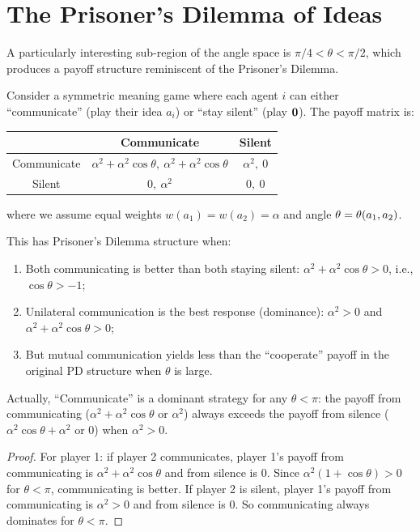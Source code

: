\section{The Prisoner's Dilemma of Ideas}

A particularly interesting sub-region of the angle space is $\pi/4 < \theta <
\pi/2$, which produces a payoff structure reminiscent of the Prisoner's Dilemma.

\begin{theorem}
\label{thm:prisoners-dilemma}
Consider a symmetric meaning game where each agent $i$ can either ``communicate''
(play their idea $a_i$) or ``stay silent'' (play $\mathbf{0}$). The payoff matrix is:

\begin{center}
\begin{tabular}{c|cc}
& Communicate & Silent \\
\hline
Communicate & $\alpha^2 + \alpha^2\cos\theta,\ \alpha^2 + \alpha^2\cos\theta$
& $\alpha^2,\ 0$ \\
Silent & $0,\ \alpha^2$ & $0,\ 0$ \\
\end{tabular}
\end{center}
where we assume equal weights $w(a_1) = w(a_2) = \alpha$ and angle $\theta
= \theta(a_1,a_2)$.

This has Prisoner's Dilemma structure when:
\begin{enumerate}
\item Both communicating is better than both staying silent:
$\alpha^2 + \alpha^2\cos\theta > 0$, i.e., $\cos\theta > -1$;
\item Unilateral communication is the best response (dominance):
$\alpha^2 > 0$ and $\alpha^2 + \alpha^2\cos\theta > 0$;
\item But mutual communication yields less than the ``cooperate'' payoff
in the original PD structure when $\theta$ is large.
\end{enumerate}
Actually, ``Communicate'' is a dominant strategy for any $\theta < \pi$: the
payoff from communicating ($\alpha^2 + \alpha^2\cos\theta$ or $\alpha^2$)
always exceeds the payoff from silence ($\alpha^2\cos\theta + \alpha^2$ or $0$)
when $\alpha^2 > 0$.
\end{theorem}

\begin{proof}
For player 1: if player 2 communicates, player 1's payoff from communicating
is $\alpha^2 + \alpha^2\cos\theta$ and from silence is $0$. Since
$\alpha^2(1 + \cos\theta) > 0$ for $\theta < \pi$, communicating is better.
If player 2 is silent, player 1's payoff from communicating is $\alpha^2 > 0$
and from silence is $0$. So communicating always dominates for $\theta < \pi$.
\end{proof}

